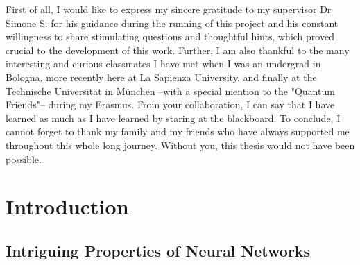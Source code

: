\documentclass[LaM,binding=0.6cm]{./packages/sapthesis/sapthesis}
\begin{document}
\begin{acknowledgments}
    First of all, I would like to express my sincere gratitude to my supervisor Dr Simone S. for his guidance during the running of this project and his 
    constant willingness to share stimulating questions and thoughtful hints, which proved crucial to the development of this work.
    Further, I am also thankful to the many interesting and curious classmates I have met when I was an undergrad in Bologna, more recently here at La Sapienza University, and finally at the 
    Technische Universität in München --with a special mention to the "Quantum Friends"-- during my Erasmus. From your collaboration, I can say that I have learned as much as I have learned by staring at the 
    blackboard. To conclude, I cannot forget to thank my family and my friends who have always supported me throughout this whole long journey. Without you, this thesis would not have been possible.
\end{acknowledgments}

\tableofcontents


\mainmatter

\chapter{Introduction}

    \section{Intriguing Properties of Neural Networks}
\end{document}
